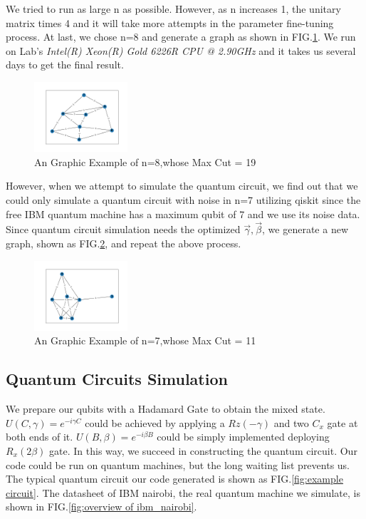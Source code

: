 We tried to run as large n as possible. However, as n increases 1, the unitary matrix times 4 and it will take more attempts in the parameter fine-tuning process. At last, we chose n=8 and generate a graph as shown in FIG.\ref{fig:n=8}. We run on Lab's \textit{Intel(R) Xeon(R) Gold 6226R CPU @ 2.90GHz} and it takes us several days to get the final result.

\begin{figure}[!htb]
    \centering
    \includegraphics[width=0.309\textwidth]{graphic_n=8.png}
    \caption{An Graphic Example of n=8,whose Max Cut = 19}
    \label{fig:n=8}
\end{figure}

However, when we attempt to simulate the quantum circuit, we find out that we could only simulate a quantum circuit with noise in n=7 utilizing qiskit since the free IBM quantum machine has a maximum qubit of 7 and we use its noise data. Since quantum circuit simulation needs the optimized $\vec{\gamma},\vec{\beta}$, we generate a new graph, shown as FIG.\ref{fig:n=7}, and repeat the above process.

\begin{figure}[!htb]
    \centering
    \includegraphics[width=0.309\textwidth]{graphic_n=7.png}
    \caption{An Graphic Example of n=7,whose Max Cut = 11}
    \label{fig:n=7}
\end{figure}

\clearpage

\subsection{Quantum Circuits Simulation}

We prepare our qubits with a Hadamard Gate to obtain the mixed state. $U(C, \gamma)=e^{-i\gamma C}$ could be achieved by applying a $Rz(-\gamma)$ and two $C_x$ gate at  both ends of it.  $U(B, \beta)=e^{-i\beta B}$ could be simply implemented deploying $R_x(2\beta)$ gate. In this way, we succeed in constructing the quantum circuit. Our code could be run on quantum machines, but the long waiting list prevents us. The typical quantum circuit our code generated is shown as FIG.\ref{fig:example circuit}. The datasheet of IBM nairobi, the real quantum machine we simulate, is shown in FIG.\ref{fig:overview of ibm_nairobi}.

